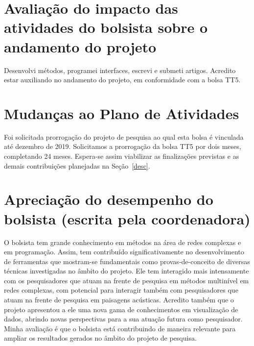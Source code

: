 \documentclass[a4paper, 11pt]{article}
\begin{document}
\section{Avaliação do impacto das atividades do bolsista sobre o andamento do projeto}
Desenvolvi métodos, programei interfaces, escrevi e submeti artigos.
Acredito estar auxiliando no andamento do projeto, em conformidade com a bolsa TT5.

\section{Mudanças ao Plano de Atividades}
Foi solicitada prorrogação do projeto de pesquisa ao qual esta bolsa é vinculada até dezembro de 2019. Solicitamos a prorrogação da bolsa TT5 por dois meses, completando 24 meses. Espera-se assim viabilizar as finalizações previstas e as demais contribuições planejadas na Seção~\ref{desc}.

\section{Apreciação do desempenho do bolsista (escrita pela coordenadora)}
O bolsista tem grande conhecimento em métodos na área de redes complexas e em programação. Assim, tem contribuído significativamente no desenvolvimento de ferramentas que mostram-se fundamentais como provas-de-conceito de diversas técnicas investigadas no âmbito do projeto. Ele tem interagido mais intensamente com os pesquisadores que atuam na frente de pesquisa em métodos multinível em redes complexas, com potencial para interagir também com pesquisadores que atuam na frente de pesquisa em paisagens acústicas. Acredito também que o projeto apresentou a ele uma nova gama de conhecimentos em visualização de dados, abrindo novas perspectivas para a sua atuação futura como pesquisador. Minha avaliação é que o bolsista está contribuindo de maneira relevante para ampliar os resultados gerados no âmbito do projeto de pesquisa.


\end{document}
